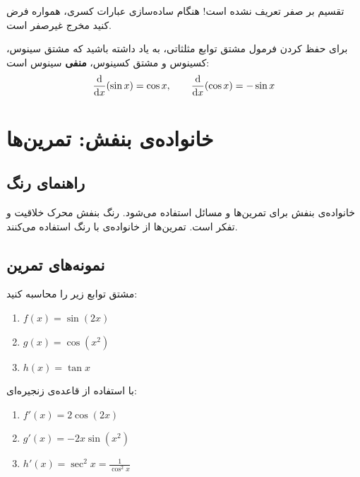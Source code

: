 \documentclass{matinbook}
\begin{document}
\begin{remark}[هشدار]
    تقسیم بر صفر تعریف نشده است! هنگام ساده‌سازی
    عبارات کسری، همواره فرض کنید مخرج غیرصفر است.
    \label{rem:division-zero}
\end{remark}

\begin{remark}
    برای حفظ کردن فرمول مشتق توابع مثلثاتی، به یاد
    داشته باشید که مشتق سینوس، کسینوس و مشتق کسینوس،
    \textbf{منفی} سینوس است:
    \[
        \frac{\mathrm{d}}{\mathrm{d}x}(\sin x) = \cos x, \qquad
        \frac{\mathrm{d}}{\mathrm{d}x}(\cos x) = -\sin x
    \]
    \label{rem:trig-derivatives}
\end{remark}

\chapter{خانواده‌ی بنفش: تمرین‌ها}
\label{chap:family-purple}

\section{راهنمای رنگ}
\label{sec:family-purple-guide}

خانواده‌ی بنفش برای تمرین‌ها و مسائل استفاده می‌شود.
رنگ بنفش محرک خلاقیت و تفکر است. تمرین‌ها از خانواده‌ی
 با رنگ  استفاده
می‌کنند.

\section{نمونه‌های تمرین}
\label{sec:family-purple-samples}

\begin{exercise}
    مشتق توابع زیر را محاسبه کنید:
    \begin{enumerate}
        \item $f(x) = \sin(2x)$
        \item $g(x) = \cos(x^{2})$
        \item $h(x) = \tan x$
    \end{enumerate}
    \label{exc:trig-derivatives}
\end{exercise}

\begin{solution}[راه‌حل]
    با استفاده از قاعده‌ی زنجیره‌ای:
    \begin{enumerate}
        \item $f'(x) = 2\cos(2x)$
        \item $g'(x) = -2x\sin(x^{2})$
        \item $h'(x) = \sec^{2} x = \frac{1}{\cos^{2} x}$
    \end{enumerate}
\end{solution}
\end{document}
